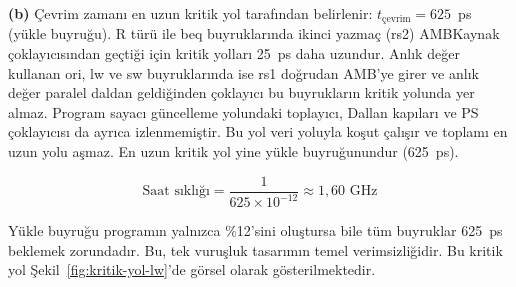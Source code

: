 \begin{ornek}[6.4]
\textbf{(b)} Çevrim zamanı en uzun kritik yol tarafından belirlenir: $t_{\text{çevrim}} = 625$~ps (yükle buyruğu). R türü ile beq buyruklarında ikinci yazmaç (rs2) AMBKaynak çoklayıcısından geçtiği için kritik yolları 25~ps daha uzundur. Anlık değer kullanan ori, lw ve sw buyruklarında ise rs1 doğrudan AMB'ye girer ve anlık değer paralel daldan geldiğinden çoklayıcı bu buyrukların kritik yolunda yer almaz. Program sayacı güncelleme yolundaki toplayıcı, Dallan kapıları ve PS çoklayıcısı da ayrıca izlenmemiştir. Bu yol veri yoluyla koşut çalışır ve toplamı en uzun yolu aşmaz. En uzun kritik yol yine yükle buyruğunundur (625~ps).

\[
\text{Saat sıklığı} = \frac{1}{625 \times 10^{-12}} \approx 1{,}60 \text{~GHz}
\]

Yükle buyruğu programın yalnızca \%12'sini oluştursa bile tüm buyruklar 625~ps beklemek zorundadır. Bu, tek vuruşluk tasarımın temel verimsizliğidir. Bu kritik yol Şekil~\ref{fig:kritik-yol-lw}'de görsel olarak gösterilmektedir.
\end{ornek}

